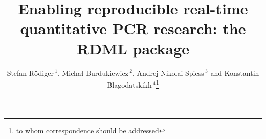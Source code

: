\documentclass{bioinfo}
\begin{document}
\title[RDML]{Enabling reproducible real-time quantitative PCR research: the RDML package}
\author[Blagodatskikh \textit{et~al}]{Stefan R\"{o}diger\,$^{1}$, Micha\l{} Burdukiewicz\,$^{2}$, Andrej-Nikolai Spiess\,$^{3}$ and Konstantin Blagodatskikh\,$^{4}$\footnote{to whom correspondence should be addressed}} 

\address{
$^{1}$Institute of Biotechnology, Brandenburg University of Technology Cottbus--Senftenberg, Senftenberg, Germany\\ 
$^{2}$Department of Genomics, Faculty of Biotechnology, University of Wroc\l{}aw, Wroc\l{}aw\\
$^{3}$University Medical Center Hamburg-Eppendorf, Hamburg, Germany\\
$^{4}$Evrogen JSC, Moscow, Russia\\ 
}
\end{document}
